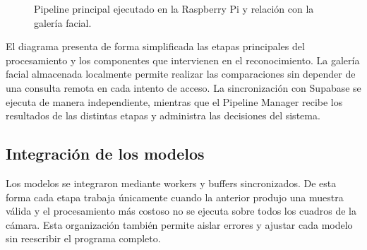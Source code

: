 \begin{figure}[H]
    \centering
    \caption{Pipeline principal ejecutado en la Raspberry Pi y relación con la galería facial.}
    \label{fig:pipeline-rpi}
\end{figure}

El diagrama presenta de forma simplificada las etapas principales del procesamiento y los componentes que intervienen en el reconocimiento. La galería facial almacenada localmente permite realizar las comparaciones sin depender de una consulta remota en cada intento de acceso. La sincronización con Supabase se ejecuta de manera independiente, mientras que el Pipeline Manager recibe los resultados de las distintas etapas y administra las decisiones del sistema.

\subsection{Integración de los modelos}

Los modelos se integraron mediante workers y buffers sincronizados. De esta forma cada etapa trabaja únicamente cuando la anterior produjo una muestra válida y el procesamiento más costoso no se ejecuta sobre todos los cuadros de la cámara. Esta organización también permite aislar errores y ajustar cada modelo sin reescribir el programa completo.

